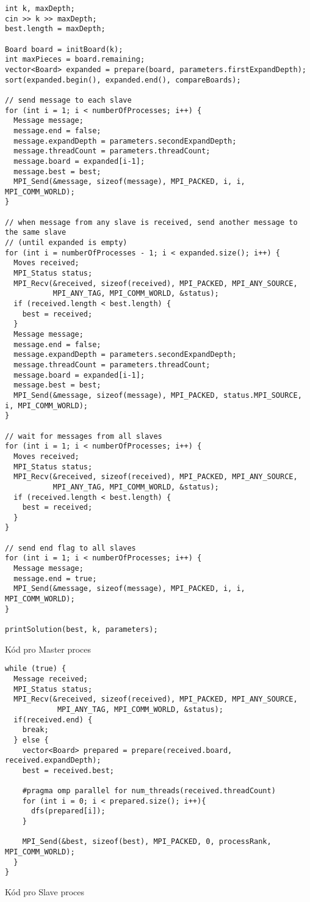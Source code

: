 \documentclass[a4paper,10pt]{article}
\begin{document}
\begin{listing}[H]
\begin{verbatim}
int k, maxDepth;
cin >> k >> maxDepth;
best.length = maxDepth;

Board board = initBoard(k);
int maxPieces = board.remaining;
vector<Board> expanded = prepare(board, parameters.firstExpandDepth);
sort(expanded.begin(), expanded.end(), compareBoards);

// send message to each slave
for (int i = 1; i < numberOfProcesses; i++) {
  Message message;
  message.end = false;
  message.expandDepth = parameters.secondExpandDepth;
  message.threadCount = parameters.threadCount;
  message.board = expanded[i-1];
  message.best = best;
  MPI_Send(&message, sizeof(message), MPI_PACKED, i, i, MPI_COMM_WORLD);
}

// when message from any slave is received, send another message to the same slave
// (until expanded is empty)
for (int i = numberOfProcesses - 1; i < expanded.size(); i++) {
  Moves received;
  MPI_Status status;
  MPI_Recv(&received, sizeof(received), MPI_PACKED, MPI_ANY_SOURCE,
           MPI_ANY_TAG, MPI_COMM_WORLD, &status);
  if (received.length < best.length) {
    best = received;
  }
  Message message;
  message.end = false;
  message.expandDepth = parameters.secondExpandDepth;
  message.threadCount = parameters.threadCount;
  message.board = expanded[i-1];
  message.best = best;
  MPI_Send(&message, sizeof(message), MPI_PACKED, status.MPI_SOURCE, i, MPI_COMM_WORLD);
}

// wait for messages from all slaves
for (int i = 1; i < numberOfProcesses; i++) {
  Moves received;
  MPI_Status status;
  MPI_Recv(&received, sizeof(received), MPI_PACKED, MPI_ANY_SOURCE,
           MPI_ANY_TAG, MPI_COMM_WORLD, &status);
  if (received.length < best.length) {
    best = received;
  }
}

// send end flag to all slaves
for (int i = 1; i < numberOfProcesses; i++) {
  Message message;
  message.end = true;
  MPI_Send(&message, sizeof(message), MPI_PACKED, i, i, MPI_COMM_WORLD);
}

printSolution(best, k, parameters);
\end{verbatim}
\caption{Kód pro Master proces}
\end{listing}

\begin{listing}[H]
\begin{verbatim}
while (true) {
  Message received;
  MPI_Status status;
  MPI_Recv(&received, sizeof(received), MPI_PACKED, MPI_ANY_SOURCE,
            MPI_ANY_TAG, MPI_COMM_WORLD, &status);
  if(received.end) {
    break;
  } else {
    vector<Board> prepared = prepare(received.board, received.expandDepth);
    best = received.best;

    #pragma omp parallel for num_threads(received.threadCount)
    for (int i = 0; i < prepared.size(); i++){
      dfs(prepared[i]);
    }

    MPI_Send(&best, sizeof(best), MPI_PACKED, 0, processRank, MPI_COMM_WORLD);
  }
}
\end{verbatim}
\caption{Kód pro Slave proces}
\end{listing}
\end{document}
